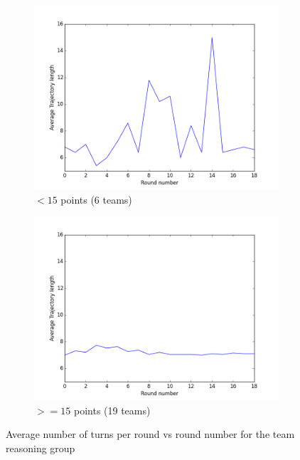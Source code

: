 \begin{figure}
\centering
\begin{subfigure}{.5\textwidth}
\centering
\includegraphics[width=\columnwidth]{figures/lengths_coordinated_rest.png}
\caption{$< 15$ points (6 teams)}
\label{fig:lengths_coordinated_rest}
\end{subfigure}%
\begin{subfigure}{.5\textwidth}
\centering
\includegraphics[width=\columnwidth]{figures/lengths_coordinated_15.png}
\caption{$>= 15$ points (19 teams)}
\label{fig:lengths_coordinated_15}
\end{subfigure}
\caption{Average number of turns per round vs round number for the team reasoning group}
\label{fig:lengths_coordinated}
\end{figure}

